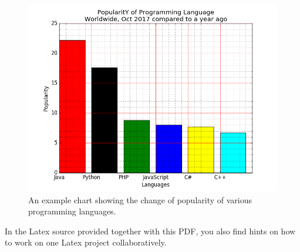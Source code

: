 \documentclass[
     12pt,         %
     a4paper,      %
     BCOR10mm,     %
     DIV14,        %
     ]{article}
\begin{document}
\begin{figure}[h]
  \centering
  \includegraphics[scale=0.3]{figures/example_barchart}
  \caption[]{An example chart showing the change of popularity of various programming languages\footnotemark[1].}
  \label{fig:example}
\end{figure}


In the Latex source provided together with this PDF, you also find hints on how to work on one Latex project collaboratively.




%
%
%





\end{document}

